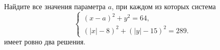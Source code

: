 \begin{ex}
	\begin{condition}
		Найдите все значения параметра \( a \), при каждом из которых система
		\[ \left\{
		\begin{array}{l}
			(x-a)^2+y^2=64,\\
			(|x|-8)^2+(|y|-15)^2=289.
		\end{array}
		\right. \]
		имеет ровно два решения.
	\end{condition}
	\answer{\( a \in \{-28\}\cup(-24;-8]\cup[8;24)\cup\{28\} \)}
\end{ex}